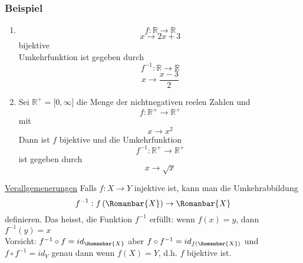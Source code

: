 \subsubsection*{Beispiel}
\begin{enumerate}
\item $$f:\mathbb{R}\rightarrow\mathbb{R}$$$$x\rightarrow 2x+3$$ bijektive\\
Umkehrfunktion ist gegeben durch $$f^{-1}:\mathbb{R}\rightarrow\mathbb{R}$$$$x\rightarrow\frac{x-3}{2}$$
\item Sei $\mathbb{R}^+=\lbrack 0,\infty\rbrack$ die Menge der nichtnegativen reelen Zahlen und $$f:\mathbb{R}^+\rightarrow\mathbb{R}^+$$ mit $$x\rightarrow x^2$$
Dann ist $f$ bijektive und die Umkehrfunktion $$f^{-1}:\mathbb{R}^+\rightarrow\mathbb{R}^+$$ ist gegeben durch $$x\rightarrow\sqrt{x}$$
\end{enumerate}

\underline{Verallgemenerungen}
Falls $f:X\rightarrow Y$ injektive ist, kann man die Umkehrabbildung $$f^{-1}:f\left(\Romanbar{X}\right)\rightarrow\Romanbar{X}$$ definieren. Das heisst, die Funktion $f^{-1}$ erfüllt: wenn $f(x)=y$, dann $f^{-1}(y)=x$\\

\noindent Vorsicht: $f^{-1}\circ f=id_{\Romanbar{X}}$ aber $f\circ f^{-1}=id_{f\left(\Romanbar{X}\right)}$ und $f\circ f^{-1}=id_Y$ genau dann wenn $f(X)=Y$, d.h. $f$ bijektive ist.